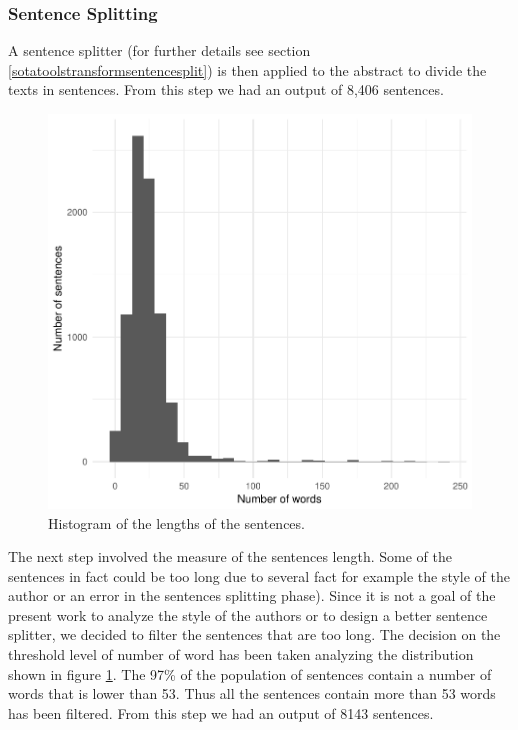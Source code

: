 \documentclass[b5paper,]{book}
\theoremstyle{definition}
\theoremstyle{definition}
\theoremstyle{definition}
\theoremstyle{remark}
\begin{document}
\subsubsection*{Sentence Splitting}\label{sentence-splitting}

A sentence splitter (for further details see section
\ref{sotatoolstransformsentencesplit}) is then applied to the abstract
to divide the texts in sentences. From this step we had an output of
8,406 sentences.

\begin{figure}

{\centering \includegraphics[width=0.8\linewidth]{_bookdown_files/figures/length_histogram_bl} 

}

\caption{Histogram of the lengths of the sentences.}\label{fig:histbllength}
\end{figure}

The next step involved the measure of the sentences length. Some of the
sentences in fact could be too long due to several fact for example the
style of the author or an error in the sentences splitting phase). Since
it is not a goal of the present work to analyze the style of the authors
or to design a better sentence splitter, we decided to filter the
sentences that are too long. The decision on the threshold level of
number of word has been taken analyzing the distribution shown in figure
\ref{fig:histbllength}. The 97\% of the population of sentences contain
a number of words that is lower than 53. Thus all the sentences contain
more than 53 words has been filtered. From this step we had an output of
8143 sentences.
\end{document}
